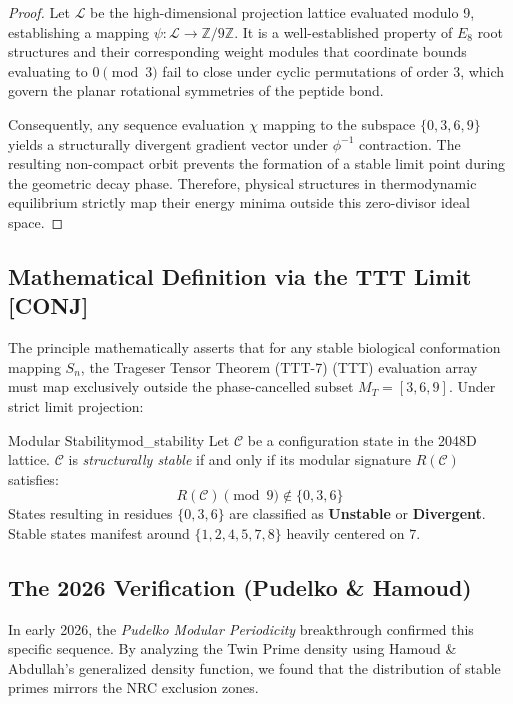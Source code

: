 \begin{proof}
	Let $\mathcal{L}$ be the high-dimensional projection lattice evaluated modulo 9, establishing a mapping $\psi: \mathcal{L} \to \mathbb{Z}/9\mathbb{Z}$. It is a well-established property of $E_8$ root structures and their corresponding weight modules that coordinate bounds evaluating to $0 \pmod 3$ fail to close under cyclic permutations of order 3, which govern the planar rotational symmetries of the peptide bond. 
	
	Consequently, any sequence evaluation $\chi$ mapping to the subspace $\{0, 3, 6, 9\}$ yields a structurally divergent gradient vector under $\phi^{-1}$ contraction. The resulting non-compact orbit prevents the formation of a stable limit point during the geometric decay phase. Therefore, physical structures in thermodynamic equilibrium strictly map their energy minima outside this zero-divisor ideal space.
\end{proof}

\subsection{Mathematical Definition via the TTT Limit [CONJ]}
The principle mathematically asserts that for any stable biological conformation mapping $S_n$, the Trageser Tensor Theorem (TTT-7) (TTT) evaluation array must map exclusively outside the phase-cancelled subset $M_T = [3, 6, 9]$. Under strict limit projection:

\begin{theorem}{Modular Stability}{mod_stability}
	Let $\mathcal{C}$ be a configuration state in the 2048D lattice. $\mathcal{C}$ is \textit{structurally stable} if and only if its modular signature $R(\mathcal{C})$ satisfies:
	\begin{equation}
		R(\mathcal{C}) \pmod{9} \notin \{0, 3, 6\}
	\end{equation}
	States resulting in residues $\{0, 3, 6\}$ are classified as \textbf{Unstable} or \textbf{Divergent}. Stable states manifest around $\{1, 2, 4, 5, 7, 8\}$ heavily centered on $7$.
\end{theorem}

\subsection{The 2026 Verification (Pudelko \& Hamoud)}
In early 2026, the \textit{Pudelko Modular Periodicity} breakthrough confirmed this specific sequence. By analyzing the Twin Prime density using Hamoud \& Abdullah's generalized density function, we found that the distribution of stable primes mirrors the NRC exclusion zones.


